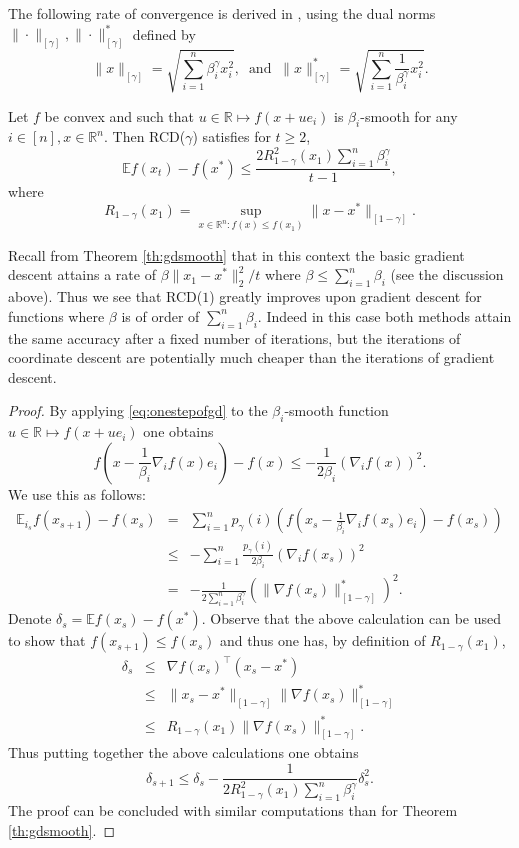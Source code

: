 \documentclass[openany]{now}
\newcommand{\E}{\mathbb{E}}
\newcommand{\R}{\mathbb{R}}
\begin{document}
The following rate of convergence is derived in \cite{Nes12}, using the dual norms $\|\cdot\|_{[\gamma]}, \|\cdot\|_{[\gamma]}^*$ defined by
$$\|x\|_{[\gamma]} = \sqrt{\sum_{i=1}^n \beta_i^{\gamma} x_i^2} , \;\; \text{and} \;\; \|x\|_{[\gamma]}^* = \sqrt{\sum_{i=1}^n \frac1{\beta_i^{\gamma}} x_i^2} .$$

\begin{theorem} \label{th:rcdgamma}
Let $f$ be convex and such that $u \in \R \mapsto f(x + u e_i)$ is $\beta_i$-smooth for any $i \in [n], x \in \R^n$. Then RCD($\gamma$) satisfies for $t \geq 2$,
$$\E f(x_{t}) - f(x^*) \leq \frac{2 R_{1 - \gamma}^2(x_1) \sum_{i=1}^n \beta_i^{\gamma}}{t-1} ,$$
where
$$R_{1-\gamma}(x_1) = \sup_{x \in \R^n : f(x) \leq f(x_1)} \|x - x^*\|_{[1-\gamma]} .$$
\end{theorem}
Recall from Theorem \ref{th:gdsmooth} that in this context the basic gradient descent attains a rate of $\beta \|x_1 - x^*\|_2^2 / t$ where $\beta \leq \sum_{i=1}^n \beta_i$ (see the discussion above). Thus we see that RCD($1$) greatly improves upon gradient descent for functions where $\beta$ is of order of $\sum_{i=1}^n \beta_i$. Indeed in this case both methods attain the same accuracy after a fixed number of iterations, but the iterations of coordinate descent are potentially much cheaper than the iterations of gradient descent. 
\begin{proof}
By applying \eqref{eq:onestepofgd} to the $\beta_i$-smooth function $u \in \R \mapsto f(x + u e_i)$ one obtains
$$f\left(x - \frac{1}{\beta_i} \nabla_i f(x) e_i\right) - f(x) \leq - \frac{1}{2 \beta_i} (\nabla_i f(x))^2 .$$
We use this as follows:
\begin{eqnarray*}
\E_{i_s} f(x_{s+1}) - f(x_s)
& = & \sum_{i=1}^n p_{\gamma}(i) \left(f\left(x_s - \frac{1}{\beta_i} \nabla_i f(x_s) e_i\right) - f(x_s) \right) \\
& \leq & - \sum_{i=1}^n \frac{p_{\gamma}(i)}{2 \beta_i} (\nabla_i f(x_s))^2 \\
& = & - \frac{1}{2 \sum_{i=1}^n \beta_i^{\gamma}} \left(\|\nabla f(x_s)\|_{[1-\gamma]}^*\right)^2 .
\end{eqnarray*}
Denote $\delta_s = \E f(x_s) - f(x^*)$. Observe that the above calculation can be used to show that $f(x_{s+1}) \leq f(x_s)$ and thus one has, by definition of $R_{1-\gamma}(x_1)$,
\begin{eqnarray*} 
\delta_s & \leq & \nabla f(x_s)^{\top} (x_s - x^*) \\
& \leq & \|x_s - x^*\|_{[1-\gamma]} \|\nabla f(x_s)\|_{[1-\gamma]}^* \\
& \leq & R_{1-\gamma}(x_1) \|\nabla f(x_s)\|_{[1-\gamma]}^* .
\end{eqnarray*}
Thus putting together the above calculations one obtains
$$\delta_{s+1} \leq \delta_s - \frac{1}{2 R_{1 - \gamma}^2(x_1) \sum_{i=1}^n \beta_i^{\gamma} } \delta_s^2 .$$
The proof can be concluded with similar computations than for Theorem \ref{th:gdsmooth}.
\end{proof}
\end{document}

